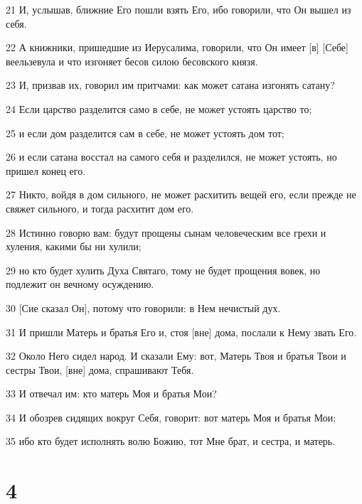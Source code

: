 \par 21 И, услышав, ближние Его пошли взять Его, ибо говорили, что Он вышел из себя.
\par 22 А книжники, пришедшие из Иерусалима, говорили, что Он имеет [в] [Себе] веельзевула и что изгоняет бесов силою бесовского князя.
\par 23 И, призвав их, говорил им притчами: как может сатана изгонять сатану?
\par 24 Если царство разделится само в себе, не может устоять царство то;
\par 25 и если дом разделится сам в себе, не может устоять дом тот;
\par 26 и если сатана восстал на самого себя и разделился, не может устоять, но пришел конец его.
\par 27 Никто, войдя в дом сильного, не может расхитить вещей его, если прежде не свяжет сильного, и тогда расхитит дом его.
\par 28 Истинно говорю вам: будут прощены сынам человеческим все грехи и хуления, какими бы ни хулили;
\par 29 но кто будет хулить Духа Святаго, тому не будет прощения вовек, но подлежит он вечному осуждению.
\par 30 [Сие сказал Он], потому что говорили: в Нем нечистый дух.
\par 31 И пришли Матерь и братья Его и, стоя [вне] дома, послали к Нему звать Его.
\par 32 Около Него сидел народ. И сказали Ему: вот, Матерь Твоя и братья Твои и сестры Твои, [вне] дома, спрашивают Тебя.
\par 33 И отвечал им: кто матерь Моя и братья Мои?
\par 34 И обозрев сидящих вокруг Себя, говорит: вот матерь Моя и братья Мои;
\par 35 ибо кто будет исполнять волю Божию, тот Мне брат, и сестра, и матерь.

\chapter{4}

